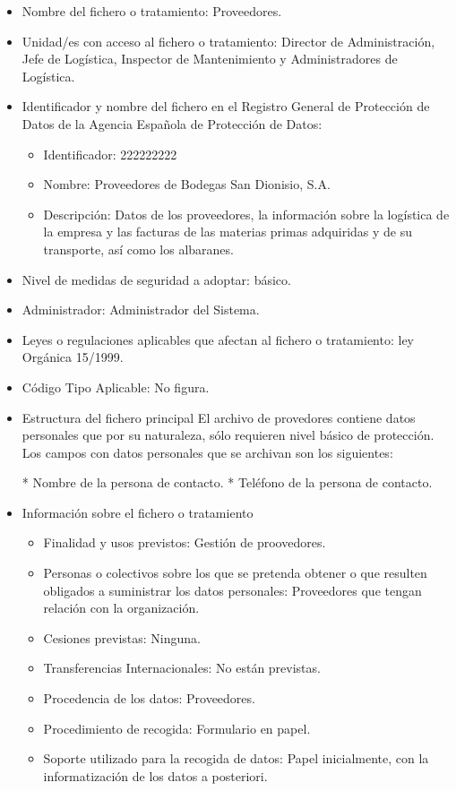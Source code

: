 \documentclass[a4paper,11pt,bibtotoc,noliststotoc]{scrbook}
\newcommand{\laorganizacion}{Bodegas San Dionisio, S.A.}
\begin{document}
\begin{itemize}
\item Nombre del fichero o tratamiento: Proveedores.

\item Unidad/es con acceso al fichero o tratamiento: Director de Administración, Jefe de Logística, Inspector de Mantenimiento y Administradores de Logística.

\item Identificador y nombre del fichero en el Registro General de Protección de Datos de la Agencia Española de Protección de Datos: 
	\begin{itemize}
	\item Identificador: 222222222
	\item Nombre: Proveedores de \laorganizacion
	\item Descripción: Datos de los proveedores, la información sobre la logística de la empresa y las facturas de las materias primas adquiridas y de su transporte, así como los albaranes.
	\end{itemize}

\item Nivel de medidas de seguridad a adoptar: básico.

\item Administrador: Administrador del Sistema.

\item Leyes o regulaciones aplicables que afectan al fichero o tratamiento: ley Orgánica 15/1999.

\item Código Tipo Aplicable: No figura.

\item Estructura del fichero principal
El archivo de provedores contiene datos personales que por su naturaleza, sólo requieren nivel básico de protección. Los campos con datos personales que se archivan son los siguientes:

* Nombre de la persona de contacto.
* Teléfono de la persona de contacto.


\item Información sobre el fichero o tratamiento
	\begin{itemize}
	\item Finalidad y usos previstos: Gestión de proovedores.
	\item Personas o colectivos sobre los que se pretenda obtener o que resulten obligados a suministrar los datos personales: Proveedores que tengan relación con la organización.
	\item Cesiones previstas: Ninguna.
	\item Transferencias Internacionales: No están previstas.
	\item Procedencia de los datos: Proveedores.
	\item Procedimiento de recogida: Formulario en papel.
	\item Soporte utilizado para la recogida de datos: Papel inicialmente, con la informatización de los datos a posteriori.
	\end{itemize}


\end{itemize}
\end{document}
